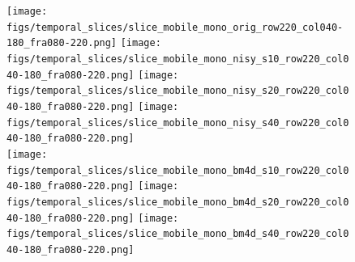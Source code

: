 \documentclass[10pt, a4paper]{article}
\begin{document}
\begin{figure}[thpb!]
	\begin{center}
		\texttt{[image: figs/temporal\_slices/slice\_mobile\_mono\_orig\_row220\_col040-180\_fra080-220.png]}%
		\texttt{[image: figs/temporal\_slices/slice\_mobile\_mono\_nisy\_s10\_row220\_col040-180\_fra080-220.png]}%
		\texttt{[image: figs/temporal\_slices/slice\_mobile\_mono\_nisy\_s20\_row220\_col040-180\_fra080-220.png]}%
		\texttt{[image: figs/temporal\_slices/slice\_mobile\_mono\_nisy\_s40\_row220\_col040-180\_fra080-220.png]}\\
		               \hspace{0.2\textwidth}%
		\texttt{[image: figs/temporal\_slices/slice\_mobile\_mono\_bm4d\_s10\_row220\_col040-180\_fra080-220.png]}%
		\texttt{[image: figs/temporal\_slices/slice\_mobile\_mono\_bm4d\_s20\_row220\_col040-180\_fra080-220.png]}%
		\texttt{[image: figs/temporal\_slices/slice\_mobile\_mono\_bm4d\_s40\_row220\_col040-180\_fra080-220.png]}\\

\end{center}
\end{figure}
\end{document}
